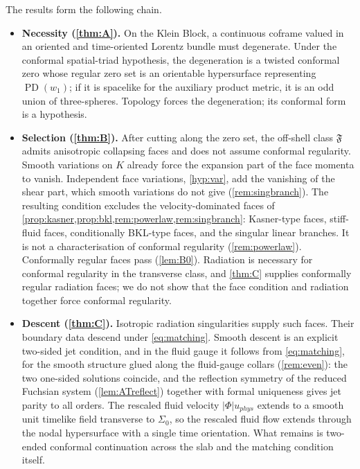 \documentclass[11pt]{article}
\theoremstyle{canonmath}
\theoremstyle{canonpostulate}
\theoremstyle{canonproposition}
\theoremstyle{canonmath}
\theoremstyle{canonproposition}
\providecommand{\PD}{\operatorname{PD}}
\providecommand{\Fcl}{\mathfrak{F}}
\providecommand{\Klein}{\mathcal{K}}
\def\mathrm#1{#1}%
\def\mathcal#1{#1}%
\begin{document}
The results form the following chain.
\begin{itemize}
\item \textbf{Necessity (\cref{thm:A}).} On the Klein Block, a continuous coframe valued in an oriented and time-oriented Lorentz bundle must degenerate. Under the conformal spatial-triad hypothesis, the degeneration is a twisted conformal zero whose regular zero set is an orientable hypersurface representing $\PD(w_1)$; if it is spacelike for the auxiliary product metric, it is an odd union of three-spheres. Topology forces the degeneration; its conformal form is a hypothesis.
\item \textbf{Selection (\cref{thm:B}).} After cutting along the zero set, the off-shell class $\Fcl$ admits anisotropic collapsing faces and does not assume conformal regularity. Smooth variations on $\Klein$ already force the expansion part of the face momenta to vanish. Independent face variations, \ref{hyp:var}, add the vanishing of the shear part, which smooth variations do not give (\cref{rem:singbranch}). The resulting condition excludes the velocity-dominated faces of \cref{prop:kasner,prop:bkl,rem:powerlaw,rem:singbranch}: Kasner-type faces, stiff-fluid faces, conditionally BKL-type faces, and the singular linear branches. It is not a characterisation of conformal regularity (\cref{rem:powerlaw}). Conformally regular faces pass (\cref{lem:B0}). Radiation is necessary for conformal regularity in the transverse class, and \cref{thm:C} supplies conformally regular radiation faces; we do not show that the face condition and radiation together force conformal regularity.
\item \textbf{Descent (\cref{thm:C}).} Isotropic radiation singularities supply such faces. Their boundary data descend under \eqref{eq:matching}. Smooth descent is an explicit two-sided jet condition, and in the fluid gauge it follows from \eqref{eq:matching}, for the smooth structure glued along the fluid-gauge collars (\cref{rem:even}): the two one-sided solutions coincide, and the reflection symmetry of the reduced Fuchsian system (\cref{lem:ATreflect}) together with formal uniqueness gives jet parity to all orders. The rescaled fluid velocity $|\Phi|u_{\mathrm{phys}}$ extends to a smooth unit timelike field transverse to $\Sigma_0$, so the rescaled fluid flow extends through the nodal hypersurface with a single time orientation. What remains is two-ended conformal continuation across the slab and the matching condition itself.

\end{itemize}
\end{document}
